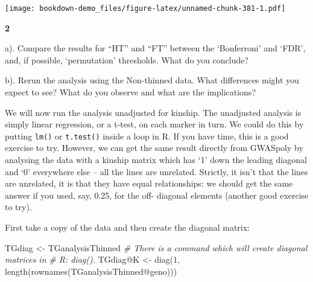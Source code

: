 \documentclass[
]{book}
\makeatletter
\newenvironment{Shaded}{\begin{snugshade}}{\end{snugshade}}
\newcommand{\AttributeTok}[1]{\textcolor[rgb]{0.77,0.63,0.00}{#1}}
\newcommand{\CommentTok}[1]{\textcolor[rgb]{0.56,0.35,0.01}{\textit{#1}}}
\newcommand{\DecValTok}[1]{\textcolor[rgb]{0.00,0.00,0.81}{#1}}
\newcommand{\FunctionTok}[1]{\textcolor[rgb]{0.00,0.00,0.00}{#1}}
\newcommand{\NormalTok}[1]{#1}
\newcommand{\OtherTok}[1]{\textcolor[rgb]{0.56,0.35,0.01}{#1}}
\newcommand{\SpecialCharTok}[1]{\textcolor[rgb]{0.00,0.00,0.00}{#1}}
\newenvironment{kframe}{%
\medskip{}
\setlength{\fboxsep}{.8em}
 \def\at@end@of@kframe{}%
 \ifinner\ifhmode%
  \def\at@end@of@kframe{\end{minipage}}%
  \begin{minipage}{\columnwidth}%
 \fi\fi%
 \def\FrameCommand##1{\hskip\@totalleftmargin \hskip-\fboxsep
 \colorbox{shadecolor}{##1}\hskip-\fboxsep
     \hskip-\linewidth \hskip-\@totalleftmargin \hskip\columnwidth}%
 \MakeFramed {\advance\hsize-\width
   \@totalleftmargin\z@ \linewidth\hsize
   \@setminipage}}%
 {\par\unskip\endMakeFramed%
 \at@end@of@kframe}
\newenvironment{rmdblock}[1]
  {
  \begin{itemize}
  \renewcommand{\labelitemi}{
    \raisebox{-.7\height}[0pt][0pt]{
      {\setkeys{Gin}{width=3em,keepaspectratio}\texttt{[image: images/\#1]}}
    }
  }
  \setlength{\fboxsep}{1em}
  \begin{kframe}
  \item
  }
  {
  \end{kframe}
  \end{itemize}
  }
\newenvironment{rmdquiz}
  {\begin{rmdblock}{quiz}}
  {\end{rmdblock}}
\makeatother
\begin{document}
\begin{Shaded}
\end{Shaded}

\texttt{[image: bookdown-demo\_files/figure-latex/unnamed-chunk-381-1.pdf]}

\begin{rmdquiz}
\textbf{2}

a). Compare the results for ``HT'' and ``FT'' between the `Bonferroni' and `FDR', and, if possible, `permutation' thresholds. What do you conclude?

b). Rerun the analysis using the Non-thinned data. What differences might you expect to see? What do you observe and what are the implications?
\end{rmdquiz}

We will now run the analysis unadjusted for kinship. The unadjusted analysis is simply linear regression, or a t-test, on each marker in turn. We could do this by putting \texttt{lm()} or \texttt{t.test()} inside a loop in R. If you have time, this is a good exercise to try. However, we can get the same result directly from GWASpoly by analysing the data with a kinship matrix which has `1' down the leading diagonal and `0' everywhere else -- all the lines are unrelated. Strictly, it isn't that the lines are unrelated, it is that they have equal relationships: we should get the same answer if you used, say, 0.25, for the off- diagonal elements (another good exercise to try).

First take a copy of the data and then create the diagonal matrix:

\begin{Shaded}
\begin{Highlighting}[]
\NormalTok{TGdiag }\OtherTok{\textless{}{-}}\NormalTok{ TGanalysisThinned}
\CommentTok{\# There is a command which will create diagonal matrices in}
\CommentTok{\# R: diag().}
\NormalTok{TGdiag}\SpecialCharTok{@}\NormalTok{K }\OtherTok{\textless{}{-}} \FunctionTok{diag}\NormalTok{(}\DecValTok{1}\NormalTok{, }\FunctionTok{length}\NormalTok{(}\FunctionTok{rownames}\NormalTok{(TGanalysisThinned}\SpecialCharTok{@}\NormalTok{geno)))}
\end{Highlighting}
\end{Shaded}
\end{document}
